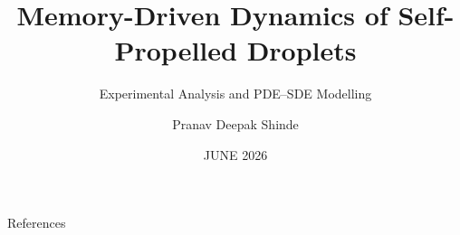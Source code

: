 \documentclass[aspectratio=169,11pt]{beamer}
\title[Active Droplet Dynamics]{Memory-Driven Dynamics of Self-Propelled Droplets}
\subtitle{
Experimental Analysis and PDE--SDE Modelling
}
\author{Pranav Deepak Shinde}
\institute{
Department of Physics\\
National Institute of Technology Karnataka, Surathkal
}
\date{JUNE 2026}
\begin{document}










\begin{frame}[allowframebreaks]{References}
	\printbibliography
\end{frame}
\end{document}

